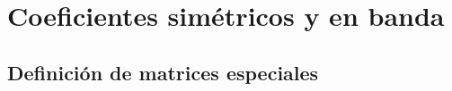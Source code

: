 \documentclass[12pt]{beamer}
\begin{document}

\section{Coeficientes simétricos y en banda}
\subsection{Definición de matrices especiales}
\end{document}
